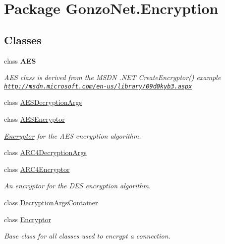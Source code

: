 \hypertarget{namespace_gonzo_net_1_1_encryption}{\section{Package Gonzo\+Net.\+Encryption}
\label{namespace_gonzo_net_1_1_encryption}
}
\subsection*{Classes}
\begin{DoxyCompactItemize}
\item 
class {\bfseries A\+E\+S}
\begin{DoxyCompactList}\small\item\em A\+E\+S class is derived from the M\+S\+D\+N .N\+E\+T Create\+Encryptor() example \href{http://msdn.microsoft.com/en-us/library/09d0kyb3.aspx}{\tt http\+://msdn.\+microsoft.\+com/en-\/us/library/09d0kyb3.\+aspx} \end{DoxyCompactList}\item 
class \hyperlink{class_gonzo_net_1_1_encryption_1_1_a_e_s_decryption_args}{A\+E\+S\+Decryption\+Args}
\item 
class \hyperlink{class_gonzo_net_1_1_encryption_1_1_a_e_s_encryptor}{A\+E\+S\+Encryptor}
\begin{DoxyCompactList}\small\item\em \hyperlink{class_gonzo_net_1_1_encryption_1_1_encryptor}{Encryptor} for the A\+E\+S encryption algorithm. \end{DoxyCompactList}\item 
class \hyperlink{class_gonzo_net_1_1_encryption_1_1_a_r_c4_decryption_args}{A\+R\+C4\+Decryption\+Args}
\item 
class \hyperlink{class_gonzo_net_1_1_encryption_1_1_a_r_c4_encryptor}{A\+R\+C4\+Encryptor}
\begin{DoxyCompactList}\small\item\em An encryptor for the D\+E\+S encryption algorithm. \end{DoxyCompactList}\item 
class \hyperlink{class_gonzo_net_1_1_encryption_1_1_decryption_args_container}{Decryption\+Args\+Container}
\item 
class \hyperlink{class_gonzo_net_1_1_encryption_1_1_encryptor}{Encryptor}
\begin{DoxyCompactList}\small\item\em Base class for all classes used to encrypt a connection. \end{DoxyCompactList}\item 

\end{DoxyCompactItemize}
